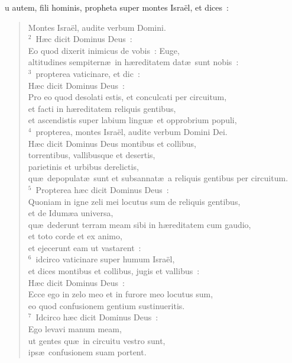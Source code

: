 \bchapter
{}u autem, fili hominis, propheta super montes Isra\"el, et dices~: \begin{flushleft}\begin{verse}\vspace{6pt}Montes Isra\"el, audite verbum Domini.\\
${}^{2}$~H\ae c dicit Dominus Deus~:\\ Eo quod dixerit inimicus de vobis~: Euge,\\ altitudines sempitern\ae\ in h\ae reditatem dat\ae\ sunt nobis~:\\
${}^{3}$~propterea vaticinare, et dic~:\\ H\ae c dicit Dominus Deus~:\\ Pro eo quod desolati estis, et conculcati per circuitum,\\ et facti in h\ae reditatem reliquis gentibus,\\ et ascendistis super labium lingu\ae\ et opprobrium populi,\\
${}^{4}$~propterea, montes Isra\"el, audite verbum Domini Dei.\\ H\ae c dicit Dominus Deus montibus et collibus,\\ torrentibus, vallibusque et desertis,\\ parietinis et urbibus derelictis,\\ qu\ae\ depopulat\ae\ sunt et subsannat\ae\ a reliquis gentibus per circuitum.\\
${}^{5}$~Propterea h\ae c dicit Dominus Deus~:\\ Quoniam in igne zeli mei locutus sum de reliquis gentibus,\\ et de Idum\ae a universa,\\ qu\ae\ dederunt terram meam sibi in h\ae reditatem cum gaudio,\\ et toto corde et ex animo,\\ et ejecerunt eam ut vastarent~:\\
${}^{6}$~idcirco vaticinare super humum Isra\"el,\\ et dices montibus et collibus, jugis et vallibus~:\\ H\ae c dicit Dominus Deus~:\\ Ecce ego in zelo meo et in furore meo locutus sum,\\ eo quod confusionem gentium sustinueritis.\\
${}^{7}$~Idcirco h\ae c dicit Dominus Deus~:\\ Ego levavi manum meam,\\ ut gentes qu\ae\ in circuitu vestro sunt,\\ ips\ae\ confusionem suam portent.\\

\end{verse}
\end{flushleft}
